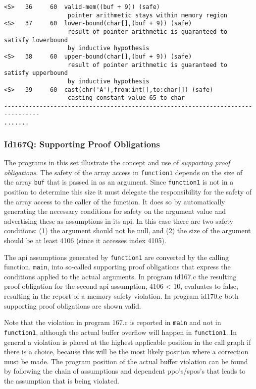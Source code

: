 \documentclass[11pt]{article}
\begin{document}
\begin{small}
\begin{verbatim}
<S>   36     60  valid-mem((buf + 9)) (safe)
                  pointer arithmetic stays within memory region
<S>   37     60  lower-bound(char[],(buf + 9)) (safe)
                  result of pointer arithmetic is guaranteed to satisfy lowerbound 
                  by inductive hypothesis
<S>   38     60  upper-bound(char[],(buf + 9)) (safe)
                  result of pointer arithmetic is guaranteed to satisfy upperbound 
                  by inductive hypothesis
<S>   39     60  cast(chr('A'),from:int[],to:char[]) (safe)
                  casting constant value 65 to char
--------------------------------------------------------------------------------
.......
\end{verbatim}
\end{small}

\subsubsection{Id167Q: Supporting Proof Obligations}

The programs in this set illustrate the concept and use of \emph{supporting proof obligations}.
The safety of the array access in {\tt function1} depends on the size of the array {\tt buf} 
that is passed in as an argument. Since {\tt function1} is not in a position to determine 
this size it must delegate the responsibility for the safety of the array access to 
the caller of the function. It does so by automatically generating the necessary 
conditions for safety on the argument value and advertising these as assumptions in 
its api. In this case there are two safety conditions: (1) the argument should not 
be null, and (2) the size of the argument should be at least 4106 (since it 
accesses index 4105).

The api assumptions generated by {\tt function1} are converted by the calling function, 
{\tt main}, into so-called supporting proof obligations that express the conditions 
applied to the actual arguments. In program id167.c the resulting proof obligation 
for the second api assumption, 4106 < 10, evaluates to false, resulting in the 
report of a memory safety violation. In program id170.c both supporting proof 
obligations are shown valid.

Note that the violation in program 167.c is reported in {\tt main} and not in {\tt function1}, 
although the actual buffer overflow will happen in {\tt function1}. In general a 
violation is placed at the highest applicable position in the call graph if there 
is a choice, because this will be the most likely position where a correction 
must be made. The program position of the actual buffer violation can be 
found by following the chain of assumptions and dependent ppo's/spos's that 
leads to the assumption that is being violated.
\end{document}
